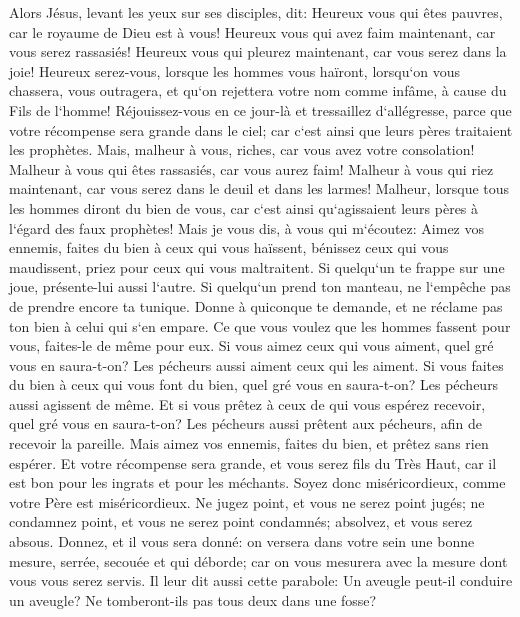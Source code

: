 \verse Alors Jésus, levant les yeux sur ses disciples, dit: Heureux vous qui êtes pauvres, car le royaume de Dieu est à vous! 
\verse Heureux vous qui avez faim maintenant, car vous serez rassasiés! Heureux vous qui pleurez maintenant, car vous serez dans la joie! 
\verse Heureux serez-vous, lorsque les hommes vous haïront, lorsqu`on vous chassera, vous outragera, et qu`on rejettera votre nom comme infâme, à cause du Fils de l`homme! 
\verse Réjouissez-vous en ce jour-là et tressaillez d`allégresse, parce que votre récompense sera grande dans le ciel; car c`est ainsi que leurs pères traitaient les prophètes. 
\verse Mais, malheur à vous, riches, car vous avez votre consolation! 
\verse Malheur à vous qui êtes rassasiés, car vous aurez faim! Malheur à vous qui riez maintenant, car vous serez dans le deuil et dans les larmes! 
\verse Malheur, lorsque tous les hommes diront du bien de vous, car c`est ainsi qu`agissaient leurs pères à l`égard des faux prophètes! 
\verse Mais je vous dis, à vous qui m`écoutez: Aimez vos ennemis, faites du bien à ceux qui vous haïssent, 
\verse bénissez ceux qui vous maudissent, priez pour ceux qui vous maltraitent. 
\verse Si quelqu`un te frappe sur une joue, présente-lui aussi l`autre. Si quelqu`un prend ton manteau, ne l`empêche pas de prendre encore ta tunique. 
\verse Donne à quiconque te demande, et ne réclame pas ton bien à celui qui s`en empare. 
\verse Ce que vous voulez que les hommes fassent pour vous, faites-le de même pour eux. 
\verse Si vous aimez ceux qui vous aiment, quel gré vous en saura-t-on? Les pécheurs aussi aiment ceux qui les aiment. 
\verse Si vous faites du bien à ceux qui vous font du bien, quel gré vous en saura-t-on? Les pécheurs aussi agissent de même. 
\verse Et si vous prêtez à ceux de qui vous espérez recevoir, quel gré vous en saura-t-on? Les pécheurs aussi prêtent aux pécheurs, afin de recevoir la pareille. 
\verse Mais aimez vos ennemis, faites du bien, et prêtez sans rien espérer. Et votre récompense sera grande, et vous serez fils du Très Haut, car il est bon pour les ingrats et pour les méchants. 
\verse Soyez donc miséricordieux, comme votre Père est miséricordieux. 
\verse Ne jugez point, et vous ne serez point jugés; ne condamnez point, et vous ne serez point condamnés; absolvez, et vous serez absous. 
\verse Donnez, et il vous sera donné: on versera dans votre sein une bonne mesure, serrée, secouée et qui déborde; car on vous mesurera avec la mesure dont vous vous serez servis. 
\verse Il leur dit aussi cette parabole: Un aveugle peut-il conduire un aveugle? Ne tomberont-ils pas tous deux dans une fosse? 
